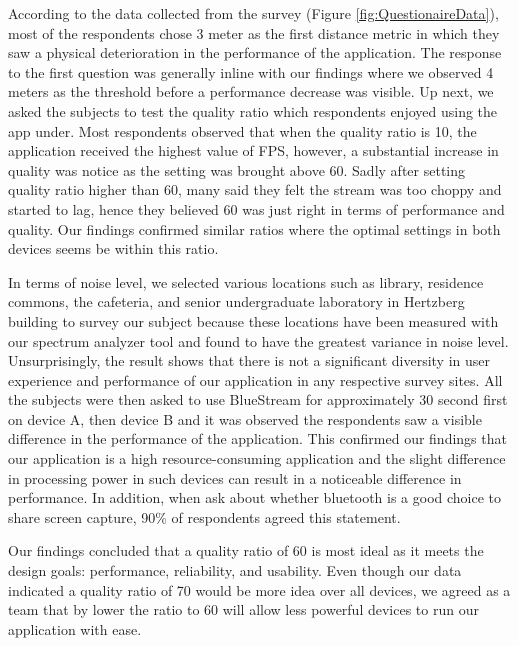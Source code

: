\documentclass[a4paper,12pt]{article}
\begin{document}
According to the data collected from the survey (Figure \ref{fig:QuestionaireData}), most of the respondents chose 3 meter as the first distance metric in which they saw a physical deterioration in the performance of the application. The response to the first question was generally inline with our findings where we observed 4 meters as the threshold before a performance decrease was visible. Up next, we asked the subjects to test the quality ratio which respondents enjoyed using the app under. Most respondents observed that when the quality ratio is 10, the application received the highest value of FPS, however, a substantial increase in quality was notice as the setting was brought above 60. Sadly after setting quality ratio higher than 60, many said they felt the stream was too choppy and started to lag, hence they believed 60 was just right in terms of performance and quality. Our findings confirmed similar ratios where the optimal settings in both devices seems be within this ratio.

In terms of noise level, we selected various locations such as library, residence commons, the cafeteria, and senior undergraduate laboratory in Hertzberg building to survey our subject because these locations have been measured with our spectrum analyzer tool and found to have the greatest variance in noise level. Unsurprisingly, the result shows that there is not a significant diversity in user experience and performance of our application in any respective survey sites. All the subjects were then asked to use BlueStream for approximately 30 second first on device A, then device B and it was observed the respondents saw a visible difference in the performance of the application. This confirmed our findings that our application is a high resource-consuming application and the slight difference in processing power in such devices can result in a noticeable difference in performance. In addition, when ask about whether bluetooth is a good choice to share screen capture, 90\% of respondents agreed this statement.

Our findings concluded that a quality ratio of 60 is most ideal as it meets the design goals: performance, reliability, and usability. Even though our data indicated a quality ratio of 70 would be more idea over all devices, we agreed as a team that by lower the ratio to 60 will allow less powerful devices to run our application with ease. 
\end{document}
